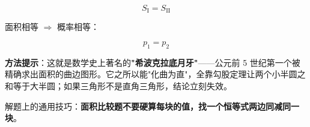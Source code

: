 \begin{answer}
\nopagebreak[4]
\[S_{\text{I}}=S_{\text{II}}\]

面积相等 $\Rightarrow$ 概率相等：

\nopagebreak[4]
\[p_1=p_2\]

\begin{gktip}
\textbf{方法提示}：这就是数学史上著名的\textbf{"希波克拉底月牙"}——公元前 5 世纪第一个被精确求出面积的曲边图形。它之所以能"化曲为直"，全靠勾股定理让两个小半圆之和等于大半圆；如果三角形不是直角三角形，结论立刻失效。

解题上的通用技巧：\textbf{面积比较题不要硬算每块的值，找一个恒等式两边同减同一块}。
\end{gktip}


\par\medskip

\end{answer}
